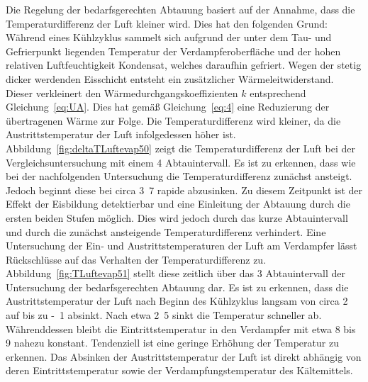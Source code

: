 Die Regelung der bedarfsgerechten Abtauung basiert auf der Annahme, dass die Temperaturdifferenz der Luft kleiner wird. Dies hat den folgenden Grund:
Während eines Kühlzyklus sammelt sich aufgrund der unter dem Tau- und Gefrierpunkt liegenden Temperatur der Verdampferoberfläche und der hohen relativen Luftfeuchtigkeit Kondensat, welches daraufhin gefriert. Wegen der stetig dicker werdenden Eisschicht entsteht ein zusätzlicher Wärmeleitwiderstand. Dieser verkleinert den Wärmedurchgangskoeffizienten $k$ entsprechend Gleichung~\ref{eq:UA}. Dies hat gemäß Gleichung~\ref{eq:4} eine Reduzierung der übertragenen Wärme zur Folge. Die Temperaturdifferenz wird kleiner, da die Austrittstemperatur der Luft infolgedessen höher ist. \newline
Abbildung~\ref{fig:deltaTLuftevap50} zeigt die Temperaturdifferenz der Luft bei der Vergleichsuntersuchung mit einem \unit{4}{\hour} Abtauintervall. Es ist zu erkennen, dass wie bei der nachfolgenden Untersuchung die Temperaturdifferenz zunächst ansteigt. Jedoch beginnt diese bei circa \unit{3.7}{\hour} rapide abzusinken. Zu diesem Zeitpunkt ist der Effekt der Eisbildung detektierbar und eine Einleitung der Abtauung durch die ersten beiden Stufen möglich. Dies wird jedoch durch das kurze Abtauintervall und durch die zunächst ansteigende Temperaturdifferenz verhindert. \newline 
Eine Untersuchung der Ein- und Austrittstemperaturen der Luft am Verdampfer lässt Rückschlüsse auf das Verhalten der Temperaturdifferenz zu.
Abbildung~\ref{fig:TLuftevap51} stellt diese zeitlich über das \unit{3}{\hour} Abtauintervall der Untersuchung der bedarfsgerechten Abtauung dar.
Es ist zu erkennen, dass die Austrittstemperatur der Luft nach Beginn des Kühlzyklus  langsam von circa \unit{2}{\celsius} auf bis zu \unit{-1}{\celsius} absinkt. Nach etwa \unit{2.5}{\hour} sinkt die Temperatur schneller ab. Währenddessen bleibt die Eintrittstemperatur in den Verdampfer mit etwa \unit{8}{\celsius} bis \unit{9}{\celsius} nahezu konstant. Tendenziell ist eine geringe Erhöhung der Temperatur zu erkennen. Das Absinken der Austrittstemperatur der Luft ist direkt abhängig von deren Eintrittstemperatur sowie der Verdampfungstemperatur des Kältemittels.

